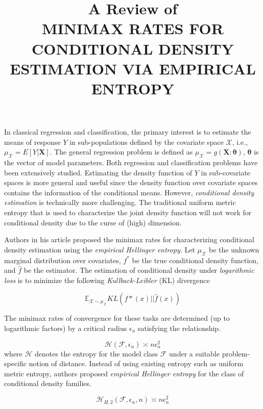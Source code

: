 \documentclass[11pt]{article}
\title{A Review of \\ MINIMAX RATES FOR CONDITIONAL DENSITY ESTIMATION VIA
	EMPIRICAL ENTROPY}
\begin{document}
	\maketitle	


In classical regression and classification, the primary interest is to estimate the means of response $Y$ in sub-populations defined by the covariate space $\mathcal{X}$, i.e., $\mu_{\mathcal{X}} = E[Y|\mathbf{X}]$. The general regression problem is defined as $\mu_{\mathcal{X}} = g(\mathbf{X}:\mathbf{\theta})$, $\mathbf{\theta}$ is the vector of model parameters. Both regression and classification problems have been extensively studied. Estimating the density function of $Y$ in sub-covariate spaces is more general and useful since the density function over covariate spaces contains the information of the conditional means. However, {\emph {conditional density estimation}} is technically more challenging. The traditional uniform metric entropy that is used to characterize the joint density function will not work for conditional density due to the curse of (high) dimension.

Authors in his article proposed the minimax rates for characterizing conditional density estimation using the {\emph {empirical Hellinger entropy}}. Let $\mu_{\mathcal{X}}$ be the unknown marginal distribution over covariates, $f^*$ be the true conditional density function, and $\hat{f}$ be the estimator. The estimation of conditional density under {\emph{logarithmic loss}} is to minimize the following {\emph{Kullback-Leibler}} (KL) divergence

$$
\mathbb{E}_{\mathcal{X} \sim \mu_{\mathcal{X}}} KL(f*(x)||\hat{f}(x))
$$

The minimax rates of convergence for these tasks are determined (up to logarithmic factors) by a critical radius $\epsilon_n$ satisfying the relationship.

\begin{equation}
\mathcal{H}(\mathcal{F},\epsilon_n) \asymp n\epsilon_n^2
\end{equation}
where $\mathcal{H}$ denotes the entropy for the model class $\mathcal{F}$ under a suitable problem-specific notion of distance. Instead of using existing entropy such as uniform metric entropy, authors proposed {\emph{empirical Hellinger entropy}} for the class of conditional density families. 

$$
\mathcal{H}_{H,2}(\mathcal{F},\epsilon_n, n) \asymp n\epsilon_n^2
$$
\end{document}
